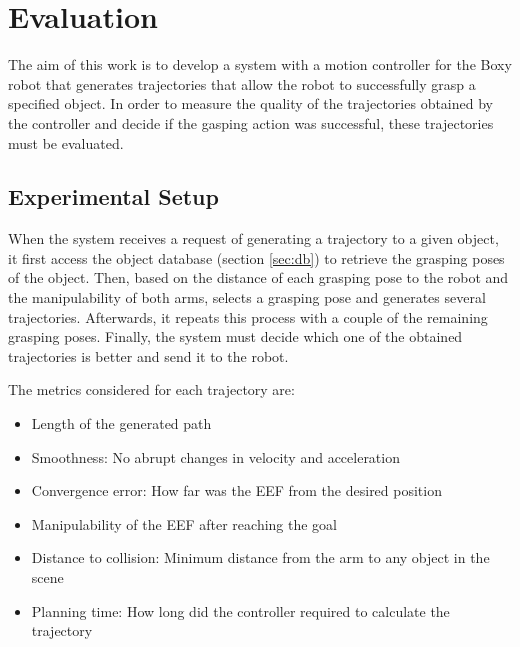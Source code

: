 

\chapter{\textbf{Evaluation}}

The aim of this work is to develop a system with a motion controller for the Boxy robot that generates trajectories that allow the robot to successfully grasp a specified object. In order to measure the quality of the trajectories obtained by the controller and decide if the gasping action was successful, these trajectories must be evaluated.


\section{Experimental Setup}

When the system receives a request of generating a trajectory to a given object, it first access the object database (section \ref{sec:db}) to retrieve the grasping poses of the object. Then, based on the distance of each grasping pose to the robot and the manipulability of both arms, selects a grasping pose and generates several trajectories. Afterwards, it repeats this process with a couple of the remaining grasping poses. Finally, the system must decide which one of the obtained trajectories is better and send it to the robot.

The metrics considered for each trajectory are:
\begin{itemize}
	\item Length of the generated path
	\item Smoothness: No abrupt changes in velocity and acceleration
	\item Convergence error: How far was the EEF from the desired position
	\item Manipulability of the EEF after reaching the goal
	\item Distance to collision: Minimum distance from the arm to any object in the scene
	\item Planning time: How long did the controller required to calculate the trajectory
\end{itemize}

